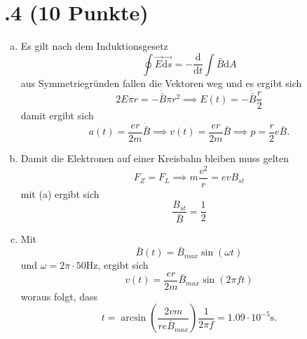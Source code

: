\section*{\nr.4 \titfour (10 Punkte)}
\begin{enumerate}[(a)]
\item Es gilt nach dem Induktionsgesetz
\begin{equation}
  \oint \vec E \vec{\mathrm{d}s} = -\frac{\mathrm{d}}{\mathrm{d}t}\int\bar{B}\mathrm{d}A
\end{equation}
aus Symmetriegründen fallen die Vektoren weg und es ergibt sich
\begin{equation}
  2E\pi r=-\dot{\bar{B}}\pi r^2 \implies E(t)=-\dot{\bar{B}}\frac{r}{2}
\end{equation}
damit ergibt sich
\begin{equation}
  a(t)=\frac{er}{2m}\dot{\bar{B}}\implies v(t)=\frac{er}{2m}\bar{B}\implies p=\frac{r}{2}e \bar{B}.
\end{equation}

\item Damit die Elektronen auf einer Kreisbahn bleiben muss gelten
\begin{equation}
  F_Z=F_L \implies m \frac{v^2}{r}=evB_{st}
\end{equation}
mit (a) ergibt sich
\begin{equation}
  \frac{B_{st}}{\bar{B}}=\frac{1}{2}
\end{equation}

\item Mit
\begin{equation}
  \bar{B}(t) = \bar{B}_{max}\sin (\omega t)
\end{equation}
und $\omega=2\pi \cdot 50 \mathrm{Hz}$, ergibt sich
\begin{equation}
  v(t)=\frac{er}{2m}\bar{B}_{max}\sin (2\pi f t)
\end{equation}
woraus folgt, dass
\begin{equation}
  t=\arcsin \left(\frac{2vm}{re\bar{B}_{max}} \right)\frac{1}{2\pi f}=1.09 \cdot 10^{-5} \mathrm{s}.
\end{equation}
\end{enumerate}